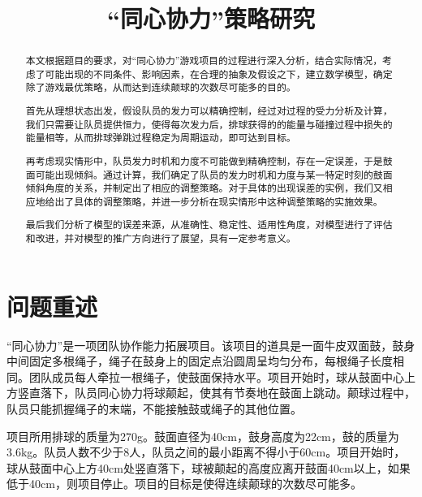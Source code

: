 \documentclass{cumcmthesis}
\title{“同心协力”策略研究}
\begin{document}
 \maketitle
 \begin{abstract}
本文根据题目的要求，对“同心协力”游戏项目的过程进行深入分析，结合实际情况，考虑了可能出现的不同条件、影响因素，在合理的抽象及假设之下，建立数学模型，确定除了游戏最优策略，从而达到连续颠球的次数尽可能多的目的。

首先从理想状态出发，假设队员的发力可以精确控制，经过对过程的受力分析及计算，我们只需要让队员提供恒力，使得每次发力后，排球获得的的能量与碰撞过程中损失的能量相等，从而排球弹跳过程稳定为周期运动，即可达到目标。

再考虑现实情形中，队员发力时机和力度不可能做到精确控制，存在一定误差，于是鼓面可能出现倾斜。通过计算，我们确定了队员的发力时机和力度与某一特定时刻的鼓面倾斜角度的关系，并制定出了相应的调整策略。对于具体的出现误差的实例，我们又相应地给出了具体的调整策略，并进一步分析在现实情形中这种调整策略的实施效果。

最后我们分析了模型的误差来源，从准确性、稳定性、适用性角度，对模型进行了评估和改进，并对模型的推广方向进行了展望，具有一定参考意义。

\end{abstract}



\renewcommand\thesection{\arabic{section}}
\section{问题重述}
“同心协力”是一项团队协作能力拓展项目。该项目的道具是一面牛皮双面鼓，鼓身中间固定多根绳子，绳子在鼓身上的固定点沿圆周呈均匀分布，每根绳子长度相同。团队成员每人牵拉一根绳子，使鼓面保持水平。项目开始时，球从鼓面中心上方竖直落下，队员同心协力将球颠起，使其有节奏地在鼓面上跳动。颠球过程中，队员只能抓握绳子的末端，不能接触鼓或绳子的其他位置。

项目所用排球的质量为270g。鼓面直径为40cm，鼓身高度为22cm，鼓的质量为3.6kg。队员人数不少于8人，队员之间的最小距离不得小于60cm。项目开始时，球从鼓面中心上方40cm处竖直落下，球被颠起的高度应离开鼓面40cm以上，如果低于40cm，则项目停止。项目的目标是使得连续颠球的次数尽可能多。
\end{document}

